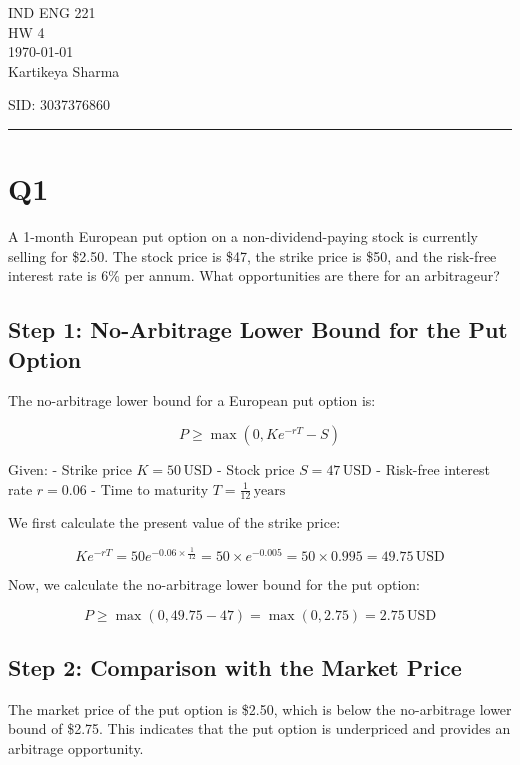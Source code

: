 \documentclass[12pt,letterpaper, onecolumn]{exam}
\begin{document}
\begingroup  
    \centering
    \LARGE IND ENG 221\\
    \LARGE HW 4\\[0.5em]
    \large \today\\[0.5em]
    \large Kartikeya Sharma\par
    \large SID: 3037376860\par
\endgroup
\rule{\textwidth}{0.4pt}
\pointsdroppedatright   %
\printanswers
\renewcommand{\solutiontitle}{\noindent\textbf{Ans:}\enspace}   %



\section*{Q1}


A 1-month European put option on a non-dividend-paying stock is currently selling for \$2.50. The stock price is \$47, the strike price is \$50, and the risk-free interest rate is 6\% per annum. What opportunities are there for an arbitrageur?
\subsection*{Step 1: No-Arbitrage Lower Bound for the Put Option}

The no-arbitrage lower bound for a European put option is:

\[
P \geq \max \left( 0, K e^{-rT} - S \right)
\]

Given:
- Strike price \( K = 50 \, \text{USD} \)
- Stock price \( S = 47 \, \text{USD} \)
- Risk-free interest rate \( r = 0.06 \)
- Time to maturity \( T = \frac{1}{12} \, \text{years} \)

We first calculate the present value of the strike price:

\[
K e^{-rT} = 50 e^{-0.06 \times \frac{1}{12}} = 50 \times e^{-0.005} = 50 \times 0.995 = 49.75 \, \text{USD}
\]

Now, we calculate the no-arbitrage lower bound for the put option:

\[
P \geq \max(0, 49.75 - 47) = \max(0, 2.75) = 2.75 \, \text{USD}
\]

\subsection*{Step 2: Comparison with the Market Price}

The market price of the put option is \$2.50, which is below the no-arbitrage lower bound of \$2.75. This indicates that the put option is underpriced and provides an arbitrage opportunity.
\end{document}
